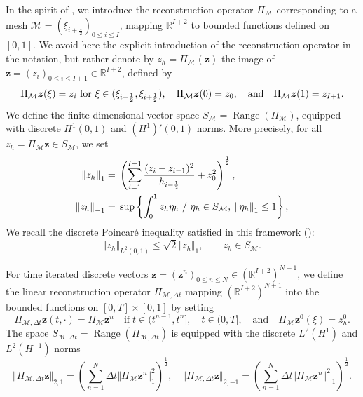 \documentclass{amsart}
\newcommand\dt{\Delta t}
\newcommand\h[1]{h_{#1 \frac{1}{2}}}
\newcommand\R{\mathbb{R}}
\newcommand\normeh[1]{{\Vert {#1} \Vert}_1}
\newcommand\normelh[1]{{\Vert {#1} \Vert}_{2,1}}
\newcommand\normehs[1]{{\Vert {#1} \Vert}_{-1}}
\newcommand\normelhs[1]{{\Vert {#1} \Vert}_{2,-1}}
\newcommand\Mm{{\mathcal M}}
\newcommand\bz{{\boldsymbol z}}
\begin{document}
		In the spirit of \cite{kangourou_2018}, we introduce the reconstruction operator $\Pi_{\mathcal{M}}$ corresponding to a 
		mesh $\mathcal M = {(\xi_{i+\frac12})}_{0 \leq i \leq I}$, mapping 
		$\R^{I+2}$ to bounded functions defined on $[0,1]$.
		 We avoid here the explicit introduction of the reconstruction operator in the notation, 
		but rather denote by $z_h = \Pi_{\mathcal{M}}\left(\boldsymbol z\right)$ the image of $\boldsymbol z =(z_i)_{0\leq i\leq I+1} \in \R^{I+2}$, defined by 
\[
\Pi_\Mm \bz (\xi) = z_i \textnormal{ for } \xi \in (\xi_{i-\frac{1}{2}}, \xi_{i+\frac{1}{2}}),
\quad 
\Pi_\Mm\bz (0) = z_0, \quad \text{and}\quad \Pi_\Mm\bz(1) = z_{I+1}. 
\]
We define the finite dimensional vector space
$S_{\mathcal M} = \operatorname{Range}(\Pi_{\mathcal M})$, 
equipped with discrete $H^1(0,1)$ and $(H^1)'(0,1)$ norms. More precisely, for all $z_h = \Pi_\Mm \bz \in S_\Mm$, we set
\begin{align*}
\normeh{z_h} =\;& \left(  \sum_{i=1}^{I+1} \frac{(z_i - z_{i-1})^2}{\h{i-}} + z_0^2 \right)^{\frac{1}{2}},\\
\normehs{z_h} =\;& \sup \left\{ \int_0^1 z_h \eta_h \textnormal{ / } \eta_h \in S_\mathcal{M}, \: \normeh{\eta_h} \leq 1 \right\}, 
\end{align*}
		We recall the discrete Poincaré inequality satisfied in this framework (\cite{CB08}):
		\begin{equation} \label{eq:poincare}
			\Vert z_h \Vert_{L^2(0,1)} \leq \sqrt{2} \normeh{z_h}, \qquad z_h \in S_\Mm. 
		\end{equation}

For time iterated discrete vectors $\bz = \left(\bz^n\right)_{0 \leq n \leq N} \in \left(\R^{I+2}\right)^{N+1}$, we define the linear reconstruction 
operator $\Pi_{\Mm,\dt}$ mapping $\left(\R^{I+2}\right)^{N+1}$ into the bounded functions on $[0,T] \times [0,1]$ by setting 
\[
 \Pi_{\Mm,\dt}\bz(t,\cdot) = \Pi_\Mm \bz^n \quad \text{if}\; t \in (t^{n-1}, t^n], \quad t \in (0,T], 
 \quad  \text{and} \quad \Pi_\Mm \bz^0(\xi) = z_h^0.
\]
The space $S_{\mathcal M,\dt} = \operatorname{Range}(\Pi_{\mathcal M,\dt})$ is equipped with the 
discrete $L^2(H^1)$ and $L^2(H^{-1})$ norms
\[
\normelh{ \Pi_{\Mm,\dt}\bz} = \left( \sum_{n=1}^N \dt \normeh{ \Pi_{\Mm}\bz^n}^2 \right)^{\frac{1}{2}},  \quad 
\normelhs{\Pi_{\Mm,\dt}\bz} = \left( \sum_{n=1}^N \dt \normehs{\Pi_{\Mm}\bz^n}^2 \right)^{\frac{1}{2}}.
\]
\end{document}
